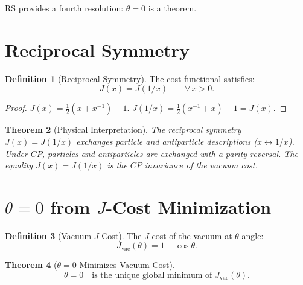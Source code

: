 \documentclass[12pt,a4paper]{article}
\newtheorem{theorem}{Theorem}[section]
\theoremstyle{definition}
\newtheorem{definition}[theorem]{Definition}
\theoremstyle{remark}
\begin{document}
RS provides a fourth resolution: $\theta = 0$ is a theorem.

\section{Reciprocal Symmetry}
\label{sec:reciprocal}

\begin{definition}[Reciprocal Symmetry]
The cost functional satisfies:
\begin{equation}
  J(x) = J(1/x) \qquad \forall\, x > 0.
\end{equation}
\end{definition}

\begin{proof}
$J(x) = \tfrac{1}{2}(x + x^{-1}) - 1$.
$J(1/x) = \tfrac{1}{2}(x^{-1} + x) - 1 = J(x)$.
\end{proof}

\begin{theorem}[Physical Interpretation]
The reciprocal symmetry $J(x) = J(1/x)$ exchanges particle and
antiparticle descriptions ($x \leftrightarrow 1/x$).  Under
$CP$, particles and antiparticles are exchanged with a parity
reversal.  The equality $J(x) = J(1/x)$ is the $CP$ invariance
of the vacuum cost.
\end{theorem}

\section{$\theta = 0$ from $J$-Cost Minimization}
\label{sec:theta-zero}

\begin{definition}[Vacuum $J$-Cost]
The $J$-cost of the vacuum at $\theta$-angle:
\begin{equation}
  J_{\mathrm{vac}}(\theta) = 1 - \cos\theta.
\end{equation}
\end{definition}

\begin{theorem}[$\theta = 0$ Minimizes Vacuum Cost]
\label{thm:theta-zero}
\begin{equation}
  \boxed{\theta = 0 \quad \text{is the unique global minimum of }
  J_{\mathrm{vac}}(\theta).}
\end{equation}
\end{theorem}
\end{document}
